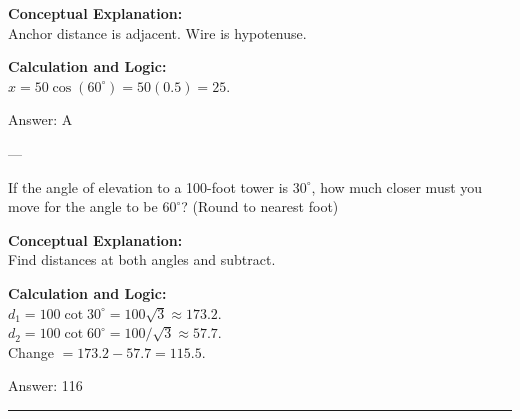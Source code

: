 \documentclass[11pt,paper=a4,answers]{exam}
\begin{document}
\begin{questions}
\begin{solution}
\textbf{Conceptual Explanation:} \\
Anchor distance is adjacent. Wire is hypotenuse.

\vspace{10pt}
\textbf{Calculation and Logic:} \\
$x = 50 \cos(60^\circ) = 50(0.5) = 25$.

\vspace{15pt}
Answer: \colorbox{yellow!100}{A}
\end{solution}

---

\question
If the angle of elevation to a 100-foot tower is $30^\circ$, how much closer must you move for the angle to be $60^\circ$? (Round to nearest foot)

\begin{solution}
\textbf{Conceptual Explanation:} \\
Find distances at both angles and subtract.

\vspace{10pt}
\textbf{Calculation and Logic:} \\
$d_1 = 100 \cot 30^\circ = 100\sqrt{3} \approx 173.2$. \\
$d_2 = 100 \cot 60^\circ = 100/\sqrt{3} \approx 57.7$. \\
Change $= 173.2 - 57.7 = 115.5$.

\vspace{15pt}
Answer: \colorbox{yellow!100}{116}
\end{solution}


\end{questions}
\begin{center}
\rule{.5\textwidth}{1pt}
\end{center}
\end{document}
